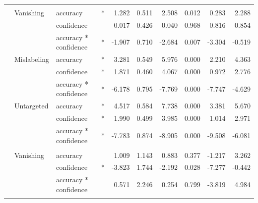 \begin{longtable}[t]{llllrrrrrr}
\cmidrule{1-10}\pagebreak[0]
\addlinespace[0.3em]
\multicolumn{10}{l}{\textbf{SSD}}\\
\hspace{1em} & Vanishing & accuracy & * & 1.282 & 0.511 & 2.508 & 0.012 & 0.283 & 2.288\\
\cmidrule{3-10}\nopagebreak
\hspace{1em} &  & confidence &  & 0.017 & 0.426 & 0.040 & 0.968 & -0.816 & 0.854\\
\cmidrule{3-10}\nopagebreak
\hspace{1em} &  & accuracy * confidence & * & -1.907 & 0.710 & -2.684 & 0.007 & -3.304 & -0.519\\
\cmidrule{2-10}\nopagebreak
\hspace{1em} & Mislabeling & accuracy & * & 3.281 & 0.549 & 5.976 & 0.000 & 2.210 & 4.363\\
\cmidrule{3-10}\nopagebreak
\hspace{1em} &  & confidence & * & 1.871 & 0.460 & 4.067 & 0.000 & 0.972 & 2.776\\
\cmidrule{3-10}\nopagebreak
\hspace{1em} &  & accuracy * confidence & * & -6.178 & 0.795 & -7.769 & 0.000 & -7.747 & -4.629\\
\cmidrule{2-10}\nopagebreak
\hspace{1em} & Untargeted & accuracy & * & 4.517 & 0.584 & 7.738 & 0.000 & 3.381 & 5.670\\
\cmidrule{3-10}\nopagebreak
\hspace{1em} &  & confidence & * & 1.990 & 0.499 & 3.985 & 0.000 & 1.014 & 2.971\\
\cmidrule{3-10}\nopagebreak
\hspace{1em} &  & accuracy * confidence & * & -7.783 & 0.874 & -8.905 & 0.000 & -9.508 & -6.081\\
\cmidrule{1-10}\pagebreak[0]
\addlinespace[0.3em]
\multicolumn{10}{l}{\textbf{RetinaNet}}\\
\hspace{1em} & Vanishing & accuracy &  & 1.009 & 1.143 & 0.883 & 0.377 & -1.217 & 3.262\\
\cmidrule{3-10}\nopagebreak
\hspace{1em} &  & confidence & * & -3.823 & 1.744 & -2.192 & 0.028 & -7.277 & -0.442\\
\cmidrule{3-10}\nopagebreak
\hspace{1em} &  & accuracy * confidence &  & 0.571 & 2.246 & 0.254 & 0.799 & -3.819 & 4.984\\
\cmidrule{2-10}\nopagebreak

\end{longtable}
